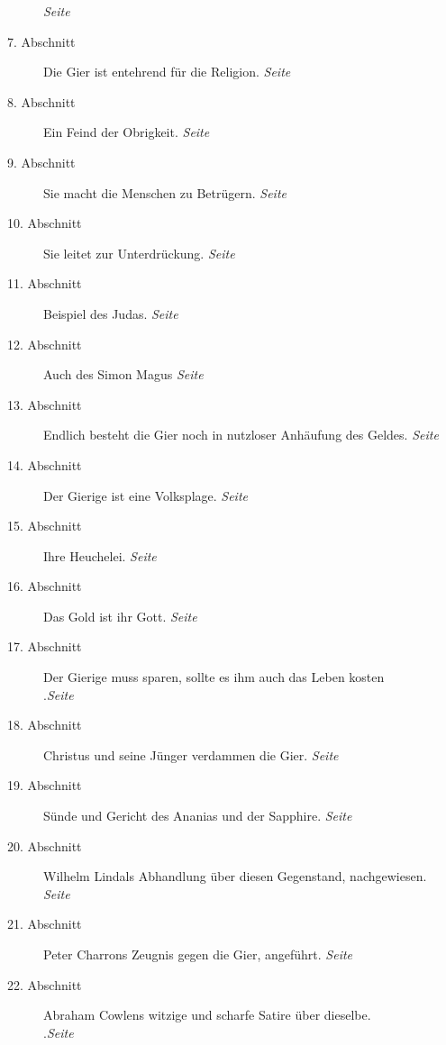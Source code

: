 \begin{description}
\dotfill \textit{Seite~\pageref{kap13_ab6}}\\
\item[7. Abschnitt] Die Gier ist entehrend für die Religion.
\dotfill \textit{Seite~\pageref{kap13_ab7}}\\
\item[8. Abschnitt] Ein Feind der Obrigkeit.
\dotfill \textit{Seite~\pageref{kap13_ab8}}\\
\item[9. Abschnitt] Sie macht die Menschen zu Betrügern.
\dotfill \textit{Seite~\pageref{kap13_ab9}}\\
\item[10. Abschnitt] Sie leitet zur Unterdrückung.
\dotfill \textit{Seite~\pageref{kap13_ab10}}\\
\item[11. Abschnitt] Beispiel des Judas.
\dotfill \textit{Seite~\pageref{kap13_ab11}}\\
\item[12. Abschnitt] Auch des Simon Magus
\dotfill \textit{Seite~\pageref{kap13_ab12}}\\
\item[13. Abschnitt] Endlich besteht die Gier noch in nutzloser Anhäufung des
Geldes.
\dotfill \textit{Seite~\pageref{kap13_ab13}}\\
\item[14. Abschnitt] Der Gierige ist eine Volksplage.
\dotfill \textit{Seite~\pageref{kap13_ab14}}\\
\item[15. Abschnitt] Ihre Heuchelei.
\dotfill \textit{Seite~\pageref{kap13_ab15}}\\
\item[16. Abschnitt] Das Gold ist ihr Gott.
\dotfill \textit{Seite~\pageref{kap13_ab16}}\\
\item[17. Abschnitt] Der Gierige muss sparen, sollte es ihm auch das Leben
kosten\\
.\dotfill \textit{Seite~\pageref{kap13_ab17}}\\
\item[18. Abschnitt] Christus und seine Jünger verdammen die Gier.
\dotfill \textit{Seite~\pageref{kap13_ab18}}\\
\item[19. Abschnitt] Sünde und Gericht des Ananias und der Sapphire.
\dotfill \textit{Seite~\pageref{kap13_ab19}}\\
\item[20. Abschnitt] Wilhelm Lindals Abhandlung über diesen Gegenstand,
nachgewiesen.
\dotfill \textit{Seite~\pageref{kap13_ab20}}\\
\item[21. Abschnitt] Peter Charrons Zeugnis gegen die Gier, angeführt.
\dotfill \textit{Seite~\pageref{kap13_ab21}}\\
\item[22. Abschnitt] Abraham Cowlens witzige und scharfe Satire über dieselbe.\\
.\dotfill \textit{Seite~\pageref{kap13_ab22}}\\

\end{description}

